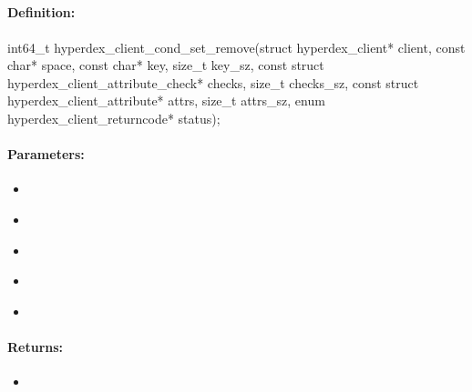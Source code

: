 \pagebreak
\subsection{}
\label{api:c:cond_set_remove}


\paragraph{Definition:}
\begin{ccode}
int64_t hyperdex_client_cond_set_remove(struct hyperdex_client* client,
        const char* space,
        const char* key, size_t key_sz,
        const struct hyperdex_client_attribute_check* checks, size_t checks_sz,
        const struct hyperdex_client_attribute* attrs, size_t attrs_sz,
        enum hyperdex_client_returncode* status);
\end{ccode}

\paragraph{Parameters:}
\begin{itemize}[noitemsep]
\item {}\\

\item {}\\

\item {}\\

\item {}\\

\item {}\\

\end{itemize}

\paragraph{Returns:}
\begin{itemize}[noitemsep]
\item {}\\

\end{itemize}

